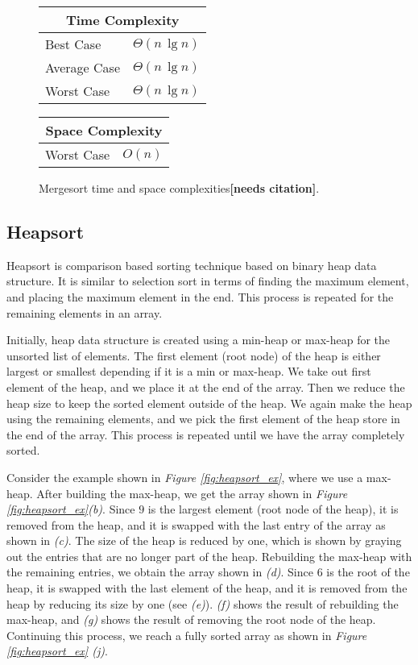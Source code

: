 \begin{figure}[!ht]
    \centering
    \begin{tabular}{l|l}
    \multicolumn{2}{c}{\textbf{Time Complexity}} \\
    \hline
    Best Case    & $\Theta(n \, \lg n)$ \\
    Average Case & $\Theta(n \, \lg n)$ \\
    Worst Case   & $\Theta(n \, \lg n)$ \\
    \end{tabular}
    \quad\quad
    \begin{tabular}{l|l}
    \multicolumn{2}{c}{\textbf{Space Complexity}} \\
    \hline
    Worst Case   & $O(n)$
    \end{tabular}
    
    \caption{Mergesort time\cite{clrs2009} and space complexities\textbf{[needs citation]}.}
    \label{fig:mergesort}
\end{figure}


\subsection{Heapsort}

Heapsort is comparison based sorting technique based on binary heap data structure. It is similar to selection sort in terms of finding the maximum element, and placing the maximum element in the end. This process is repeated for the remaining elements in an array. 

Initially, heap data structure is created using a min-heap or max-heap for the unsorted list of elements. The first element (root node) of the heap is either largest or smallest depending if it is a min or max-heap. We take out first element of the heap, and we place it at the end of the array. Then we reduce the heap size to keep the sorted element outside of the heap. We again make the heap using the remaining elements, and we pick the first element of the heap store in the end of the array. This process is repeated until we have the array completely sorted. 

Consider the example shown in \textit{Figure \ref{fig:heapsort_ex}}, where we use a max-heap. After building the max-heap, we get the array shown in \textit{Figure \ref{fig:heapsort_ex}(b)}. Since $9$ is the largest element (root node of the heap), it is removed from the heap, and it is swapped with the last entry of the array as shown in \textit{(c)}. The size of the heap is reduced by one, which is shown by graying out the entries that are no longer part of the heap. Rebuilding the max-heap with the remaining entries, we obtain the array shown in \textit{(d)}. Since $6$ is the root of the heap, it is swapped with the last element of the heap, and it is removed from the heap by reducing its size by one (see \textit{(e)}). \textit{(f)} shows the result of rebuilding the max-heap, and \textit{(g)} shows the result of removing the root node of the heap. Continuing this process, we reach a fully sorted array as shown in \textit{Figure \ref{fig:heapsort_ex} (j)}.

